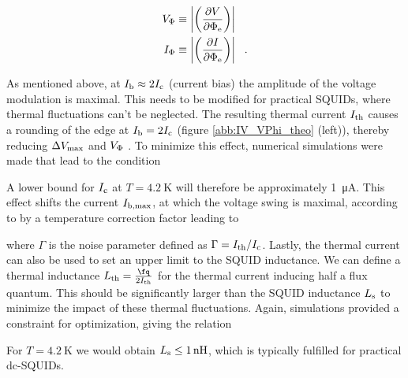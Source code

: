 \begin{align}
V_{\rm \Phi} &\equiv \left| \left(\frac{\partial V}{\partial\Phi_{\rm e}}\right)\right| \\ I_{\rm \Phi} &\equiv \left| \left(\frac{\partial I}{\partial\Phi_{\rm e}}\right)\right| \ \ .
\end{align}

As mentioned above, at $I_{\rm b}\approx 2I_{\rm c}$ (current bias) the amplitude of the voltage modulation is maximal. This needs to be modified for practical SQUIDs, where thermal fluctuations can't be neglected. The resulting thermal current $I_{\rm th}$ causes a rounding of the edge at $I_{\rm b}= 2I_{\rm c}$ (figure \ref{abb:IV_VPhi_theo} (left)), thereby reducing $\Delta V_{\rm max}$ and $V_{\rm \Phi}$ \cite{Ivanchenko1968}. To minimize this effect, numerical simulations were made that lead to the condition \cite{Clarke1988}


A lower bound for $I_{\rm c}$ at $T=\qty{4.2}{\kelvin}$ will therefore be approximately \qty{1}{\uA}. This effect shifts the current $I_{\rm b,max}$, at which the voltage swing is maximal, according to \cite{Drung1996} by a temperature correction factor leading to 


where $\Gamma$ is the noise parameter defined as $\Gamma=I_{\rm th}/I_{\rm c}$. Lastly, the thermal current can also be used to set an upper limit to the SQUID inductance. We can define a thermal inductance $L_{\rm th}=\frac{\unit{\fq}}{2I_{\rm th}}$ for the thermal current inducing half a flux quantum. This should be significantly larger than the SQUID inductance $L_{\rm s}$ to minimize the impact of these thermal fluctuations. Again, simulations provided a constraint for optimization, giving the relation \cite{Clarke1988}


For $T=\qty{4.2}{\kelvin}$ we would obtain $L_{\rm s}\leq\qty{1}{n\henry}$, which is typically fulfilled for practical dc-SQUIDs.

